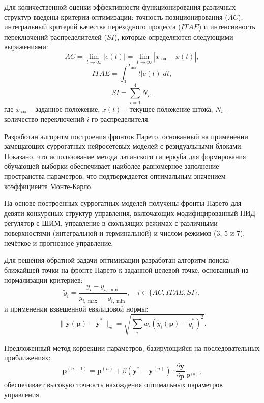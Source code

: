Для количественной оценки эффективности функционирования различных структур введены критерии
оптимизации: точность позиционирования ($AC$), интегральный критерий качества переходного процесса ($ITAE$) и
интенсивность переключений распределителей ($SI$), которые определяются следующими выражениями:
\begin{equation}
	AC = \lim_{t \to \infty} |e(t)| = \lim_{t \to \infty} |x_{\text{зад}} - x(t)|,
\end{equation}
\begin{equation}
	ITAE = \int_0^{T_{\text{мод}}} t |e(t)| dt,
\end{equation}
\begin{equation}
	SI = \sum_{i=1}^4 N_i,
\end{equation}
где $x_{\text{зад}}$ -- заданное положение,
$x(t)$ -- текущее положение штока,
$N_i$ -- количество переключений $i$-го распределителя.

Разработан алгоритм построения фронтов Парето, основанный на
применении замещающих суррогатных нейросетевых моделей с резидуальными блоками.
Показано, что использование метода латинского гиперкуба для формирования обучающей
выборки обеспечивает наиболее равномерное заполнение пространства параметров, что подтверждается оптимальным значением коэффициента Монте-Карло.

На основе построенных суррогатных моделей получены фронты Парето для девяти конкурсных
структур управления, включающих модифицированный ПИД-регулятор с ШИМ, управление в скользящих
режимах с различными поверхностями (интегральной и терминальной) и числом режимов (3, 5 и 7), нечёткое и прогнозное управление.

Для решения обратной задачи оптимизации разработан алгоритм поиска ближайшей
точки на фронте Парето к заданной целевой точке, основанный на нормализации критериев:
\begin{equation}
	\tilde{y}_i = \frac{y_i - y_{i,\min}}{y_{i,\max} - y_{i,\min}}, \quad i \in \{AC, ITAE, SI\},
\end{equation}
и применении взвешенной евклидовой нормы:
\begin{equation}
	\|\mathbf{\tilde{y}}(\mathbf{p}) - \mathbf{\tilde{y}}^*\|_w = \sqrt{\sum_{i} w_i (\tilde{y}_i(\mathbf{p}) - \tilde{y}_i^*)^2}.
\end{equation}

Предложенный метод коррекции параметров, базирующийся на
последовательных приближениях:
\begin{equation}
	\mathbf{p}^{(n+1)} = \mathbf{p}^{(n)} + \beta (\mathbf{y}^* - \mathbf{y}^{(n)}) \cdot \frac{\partial \mathbf{y}}{\partial \mathbf{p}}|_{\mathbf{p}^{(n)}},
\end{equation}
обеспечивает высокую точность нахождения оптимальных параметров управления.

